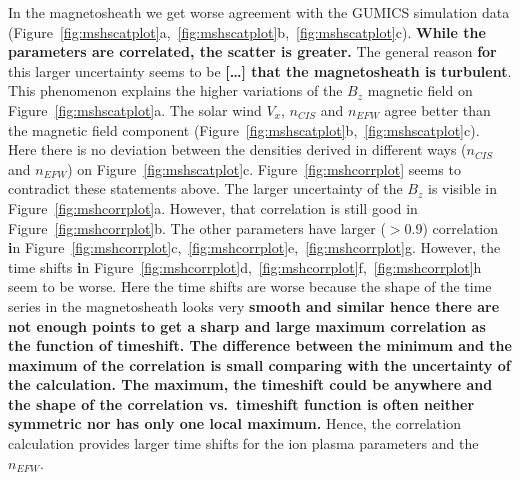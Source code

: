 \documentclass[linenumbers,draft]{agujournal}
\begin{document}
In the magnetosheath we get worse agreement with the GUMICS simulation data (Figure~\ref{fig:mshscatplot}a,~\ref{fig:mshscatplot}b,~\ref{fig:mshscatplot}c). \textbf{While the parameters are correlated, the scatter is greater.} The general reason \textbf{for} this larger uncertainty seems to be \textbf{[\dots] that the magnetosheath is turbulent}. This phenomenon explains the higher variations of the $B_{z}$ magnetic field on Figure~\ref{fig:mshscatplot}a. The solar wind $V_{x}$, $n_{CIS}$ and $n_{EFW}$ agree better than the magnetic field component (Figure~\ref{fig:mshscatplot}b,~\ref{fig:mshscatplot}c). Here there is no deviation between the densities derived in different ways ($n_{CIS}$ and $n_{EFW}$) on Figure~\ref{fig:mshscatplot}c. Figure~\ref{fig:mshcorrplot} seems to contradict these statements above. The larger uncertainty of the $B_{z}$ is visible in Figure~\ref{fig:mshcorrplot}a. However, that correlation is still good in Figure~\ref{fig:mshcorrplot}b. The other parameters have larger ($>0.9$) correlation \textbf{i}n Figure~\ref{fig:mshcorrplot}c,~\ref{fig:mshcorrplot}e,~\ref{fig:mshcorrplot}g. However, the time shifts \textbf{i}n Figure~\ref{fig:mshcorrplot}d,~\ref{fig:mshcorrplot}f,~\ref{fig:mshcorrplot}h seem to be worse. Here the time shifts are worse because the shape of the time series in the magnetosheath looks very \textbf{smooth and similar hence there are not enough points to get a sharp and large maximum correlation as the function of timeshift. The difference between the minimum and the maximum of the correlation is small comparing with the uncertainty of the calculation. The maximum, the timeshift could be anywhere and the shape of the correlation vs.~timeshift function is often neither symmetric nor has only one local maximum.} Hence, the correlation calculation provides larger time shifts for the ion plasma parameters and the $n_{EFW}$. 
\end{document}
